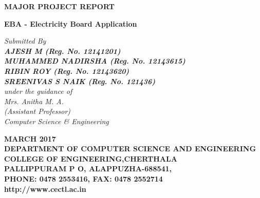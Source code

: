 \documentclass[12pt,a4paper,oneside]{report}
\begin{document}
\renewcommand\bibname{References}
\begin{titlepage}
\begin{center}
\Large{\textbf{MAJOR PROJECT REPORT}}\\
\vspace{.2 in}
\begin{singlespace}
\LARGE{\textbf{EBA - Electricity Board Application }}\\
\end{singlespace}
\vspace{.1 in}
\Large{\textit{Submitted By }}\\
\Large{\textit{\textbf{AJESH M (Reg. No. 12141201)}}} \\
\Large{\textit{\textbf{MUHAMMED NADIRSHA (Reg. No. 12143615)}}} \\
\Large{\textit{\textbf{RIBIN ROY (Reg. No. 12143620)}}} \\
\Large{\textit{\textbf{SREENIVAS S NAIK (Reg. No. 121436)}}} \\
\Large{\textit{\textit{under the guidance of}}}\\
\Large{\textit{Mrs. Anitha M. A.}}\\
\Large{\textit{(Assistant Professor)}}\\
\Large{\textit{Computer Science \& Engineering}}
\vspace{.05in}
\begin{figure}[h]
\begin{center}
\end{center}
\end{figure}
\begin{singlespace}
\large{\textbf{MARCH 2017}}\\
\vspace{.1in}
\large{\textbf{DEPARTMENT OF COMPUTER SCIENCE AND ENGINEERING\\COLLEGE OF ENGINEERING,CHERTHALA\\ PALLIPPURAM P O, ALAPPUZHA-688541, \\PHONE: 0478 2553416, FAX: 0478 2552714\\http://www.cectl.ac.in}}
\end{singlespace}
\end{center}
\end{titlepage}
\end{document}
